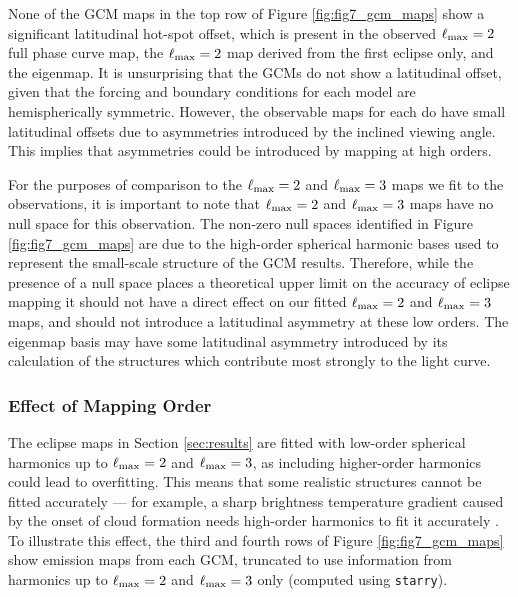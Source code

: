 \documentclass[twocolumn]{aastex631}
\begin{document}
None of the GCM maps in the top row of Figure \ref{fig:fig7_gcm_maps} show a significant latitudinal hot-spot offset, which is present in the observed $\ell_{\rm max}=2$ full phase curve map, the $\ell_{\rm max}=2$ map derived from the first eclipse only, and the eigenmap. It is unsurprising that the GCMs do not show a latitudinal offset, given that the forcing and boundary conditions for each model are hemispherically symmetric. However, the observable maps for each do have small latitudinal offsets due to asymmetries introduced by the inclined viewing angle. This implies that asymmetries could be introduced by mapping at high orders.




For the purposes of comparison to the $\ell_{\rm max}=2$ and $\ell_{\rm max}=3$ maps we fit to the observations, it is important to note that $\ell_{\rm max}=2$ and $\ell_{\rm max}=3$ maps have no null space for this observation. The non-zero null spaces identified in Figure \ref{fig:fig7_gcm_maps} are due to the high-order spherical harmonic bases used to represent the small-scale structure of the GCM results. Therefore, while the presence of a null space places a theoretical upper limit on the accuracy of eclipse mapping it should not have a direct effect on our fitted $\ell_{\rm max}=2$ and $\ell_{\rm max}=3$ maps, and should not introduce a latitudinal asymmetry at these low orders. The eigenmap basis may have some latitudinal asymmetry introduced by its calculation of the structures which contribute most strongly to the light curve.

\newpage
\subsubsection{Effect of Mapping Order}

The eclipse maps in Section \ref{sec:results} are fitted with low-order spherical harmonics up to $\ell_{\rm max}=2$ and $\ell_{\rm max}=3$, as including higher-order harmonics could lead to overfitting. This means that some realistic structures cannot be fitted accurately --- for example, a sharp brightness temperature gradient caused by the onset of cloud formation needs high-order harmonics to fit it accurately \citep{parmentier2016transitions}. To illustrate this effect, the third and fourth rows of Figure \ref{fig:fig7_gcm_maps} show emission maps from each GCM, truncated to use information from harmonics up to $\ell_{\rm max}=2$ and $\ell_{\rm max}=3$ only (computed using \texttt{starry}). 
\end{document}
